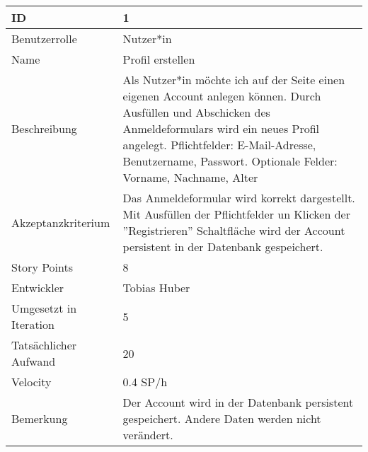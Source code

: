 \begin{tabularx}{\textwidth}{|p{}|X|}
		\hline
		ID & 1 \\
		\hline
		Benutzerrolle & Nutzer*in \\
		\hline
		Name & Profil erstellen \\
		\hline
		Beschreibung & Als Nutzer*in möchte ich auf der Seite einen eigenen Account anlegen können. Durch Ausfüllen und Abschicken des Anmeldeformulars wird ein neues Profil angelegt.  Pflichtfelder:
		E-Mail-Adresse,
		Benutzername,
		Passwort.
		Optionale Felder:
		Vorname,
		Nachname,
		Alter \\
		\hline
		Akzeptanzkriterium & Das Anmeldeformular wird korrekt dargestellt. Mit Ausfüllen der Pflichtfelder un Klicken der ''Registrieren'' Schaltfläche  wird der Account persistent in der Datenbank gespeichert. \\
		\hline
		Story Points & 8 \\
		\hline
		Entwickler & Tobias Huber \\
		\hline
		Umgesetzt in Iteration & 5 \\
		\hline
		Tatsächlicher Aufwand & 20 \\
		\hline
		Velocity & 0.4 SP/h \\
		\hline
		Bemerkung &  Der Account wird in der Datenbank persistent gespeichert. Andere Daten werden nicht verändert.\\
		\hline
\end{tabularx}
\vspace{20pt}
